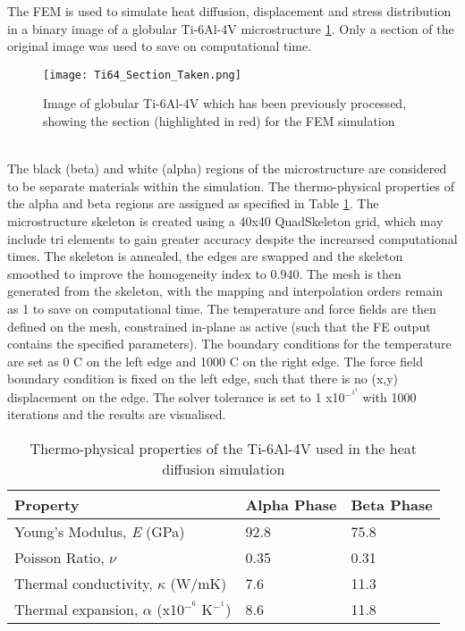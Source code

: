 \documentclass[report.tex]{subfiles}
\begin{document}
The FEM is used to simulate heat diffusion, displacement and stress distribution in a binary image of a globular Ti-6Al-4V microstructure \ref{fig:FinalSimulationInput}. Only a section of the original image was used to save on computational time.
\\
\begin{figure}[h!]
    \centering
    \texttt{[image: Ti64\_Section\_Taken.png]}
    \caption{Image of globular Ti-6Al-4V which has been previously processed, showing the section (highlighted in red) for the FEM simulation}
    \label{fig:FinalSimulationInput}
\end{figure}
\\
The black (beta) and white (alpha) regions of the microstructure are considered to be separate materials within the simulation. The thermo-physical properties of the alpha and beta regions are assigned as specified in Table \ref{tab:Ti64Properties}. The microstructure skeleton is created using a 40x40 QuadSkeleton grid, which may include tri elements to gain greater accuracy despite the increarsed computational times. The skeleton is annealed, the edges are swapped and the skeleton smoothed to improve the homogeneity index to 0.940. The mesh is then generated from the skeleton, with the mapping and interpolation orders remain as 1 to save on computational time. The temperature and force fields are then defined on the mesh, constrained in-plane as active (such that the FE output contains the specified parameters). The boundary conditions for the temperature are set as 0 \degree C on the left edge and 1000 \degree C on the right edge. The force field boundary condition is fixed on the left edge, such that there is no (x,y) displacement on the edge. The solver tolerance is set to 1 x10$^-^1^3$ with 1000 iterations and the results are visualised.

\begin{center}
  \begin{table}[h!]
  \caption{\label{tab:Ti64Properties}Thermo-physical properties of the Ti-6Al-4V used in the heat diffusion simulation}
  \begin{center}
  \begin{tabular}{|p{6cm}|p{3cm}|p{3cm}|}
  \hline
  \textbf{Property} &\textbf{Alpha Phase} &\textbf{Beta Phase}\\
  \hline
  Young's Modulus, \textit{E} (GPa) & 92.8 & 75.8 \\
   \hline
   Poisson Ratio, $\nu$ & 0.35 & 0.31 \\
   \hline
   Thermal conductivity, $\kappa$ (W/mK) & 7.6 & 11.3 \\
   \hline
   Thermal expansion, $\alpha$ (x10$^-^6$ K$^-^1$) & 8.6 & 11.8 \\
   \hline  
  \end{tabular}
  \end{center}
  \end{table}
\end{center}
\end{document}
